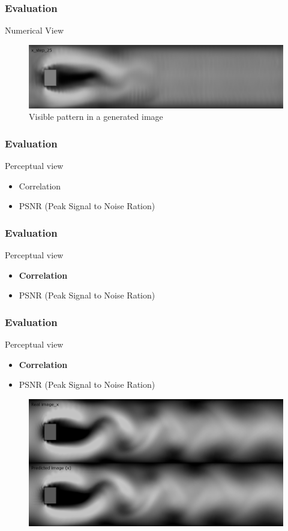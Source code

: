 \documentclass[18pt, xcolor=table]{beamer}
\begin{document}
\begin{frame}[t]
  \frametitle{Evaluation}
  \large{Numerical View}
  \vspace{1.5cm}
  \begin{figure}[htb]
    \includegraphics[scale=0.29]{images/bad_pattern}
    \caption{Visible pattern in a generated image}
  \end{figure}
\end{frame}

\begin{frame}[t]
  \frametitle{Evaluation}
  \large{Perceptual view}
  \begin{itemize}
  \item Correlation
  \item PSNR (Peak Signal to Noise Ration)
  \end{itemize}
\end{frame}

\begin{frame}[t]
  \frametitle{Evaluation}
  \large{Perceptual view}
  \begin{itemize}
  \item \textbf{Correlation}
  \item PSNR (Peak Signal to Noise Ration)
  \end{itemize}
\end{frame}

\begin{frame}[t]
  \frametitle{Evaluation}
  \large{Perceptual view}
  \begin{itemize}
  \item \textbf{Correlation}
  \item PSNR (Peak Signal to Noise Ration)
  \end{itemize}
  \begin{center}
    \begin{figure}[htb]
      \includegraphics[scale=0.23]{images/res/prediction}
    \end{figure}
  \end{center}
\end{frame}
\end{document}
